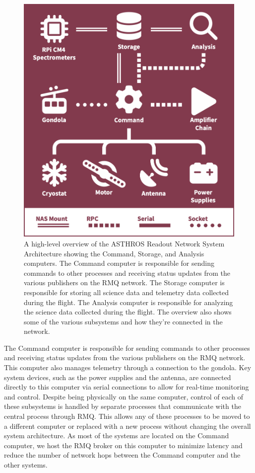 \begin{figure}
    \centering
    \includegraphics[width=0.5\linewidth]{figs/spectra/system.png}
    \caption[High-Level System Diagram for ASTHROS]{A high-level overview of the ASTHROS Readout Network System Architecture showing the Command, Storage, and Analysis computers. The Command computer is responsible for sending commands to other processes and receiving status updates from the various publishers on the RMQ network. The Storage computer is responsible for storing all science data and telemetry data collected during the flight. The Analysis computer is responsible for analyzing the science data collected during the flight. The overview also shows some of the various subsystems and how they're connected in the network.}
    \label{spectra/fig:system}
\end{figure}

The Command computer is responsible for sending commands to other processes and receiving status updates from the various publishers on the RMQ network. 
This computer also manages telemetry through a connection to the gondola. 
Key system devices, such as the power supplies and the antenna, are connected directly to this computer via serial connections to allow for real-time monitoring and control.
Despite being physically on the same computer, control of each of these subsystems is handled by separate processes that communicate with the central process through RMQ.
This allows any of these processes to be moved to a different computer or replaced with a new process without changing the overall system architecture.
As most of the systems are located on the Command computer, we host the RMQ broker on this computer to minimize latency and reduce the number of network hops between the Command computer and the other systems.

